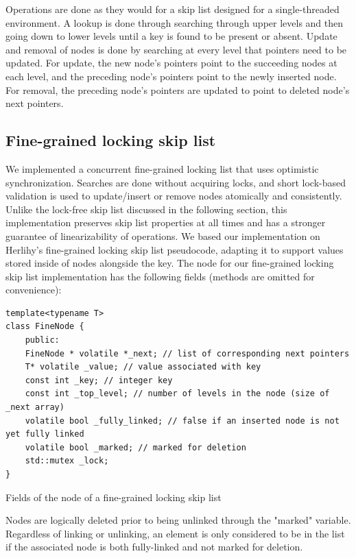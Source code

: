 \documentclass[11pt]{article}
\begin{document}
Operations are done as they would for a skip list designed for a single-threaded environment. A lookup is done through searching through upper levels and then going down to lower levels until a key is found to be present or absent. Update and removal of nodes is done by searching at every level that pointers need to be updated. For update, the new node's pointers point to the succeeding nodes at each level, and the preceding node's pointers point to the newly inserted node. For removal, the preceding node's pointers are updated to point to deleted node's next pointers.
\subsection{Fine-grained locking skip list}
We implemented a concurrent fine-grained locking list that uses optimistic synchronization. Searches are done without acquiring locks, and short lock-based validation is used to update/insert or remove nodes atomically and consistently.\cite{herlihy2006provably} Unlike the lock-free skip list discussed in the following section, this implementation preserves skip list properties at all times and has a stronger guarantee of linearizability of operations. 
We based our implementation on Herlihy's fine-grained locking skip list pseudocode, adapting it to support values stored inside of nodes alongside the key.
The node for our fine-grained locking skip list implementation has the following fields (methods are omitted for convenience): 
\begin{listing}[!ht]
\begin{verbatim}
template<typename T>
class FineNode {
    public:
    FineNode * volatile *_next; // list of corresponding next pointers
    T* volatile _value; // value associated with key
    const int _key; // integer key
    const int _top_level; // number of levels in the node (size of _next array)
    volatile bool _fully_linked; // false if an inserted node is not yet fully linked
    volatile bool _marked; // marked for deletion
    std::mutex _lock;
}
\end{verbatim}
\caption{Fields of the node of a fine-grained locking skip list}
\label{listing:2}
\end{listing}
Nodes are logically deleted prior to being unlinked through the "marked" variable. Regardless of linking or unlinking, an element is only considered to be in the list if the associated node is both fully-linked and not marked for deletion.
\end{document}
